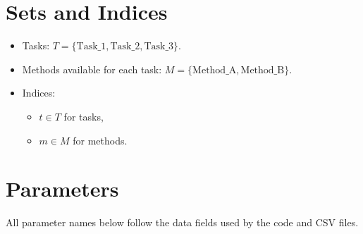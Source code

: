 \section*{Sets and Indices}

\begin{itemize}
    \item Tasks: $T=\{\text{Task\_1},\text{Task\_2},\text{Task\_3}\}$.
    \item Methods available for each task: $M=\{\text{Method\_A},\text{Method\_B}\}$.
    \item Indices:
    \begin{itemize}
        \item $t \in T$ for tasks,
        \item $m \in M$ for methods.
    \end{itemize}
\end{itemize}

\section*{Parameters}

All parameter names below follow the data fields used by the code and CSV files.

